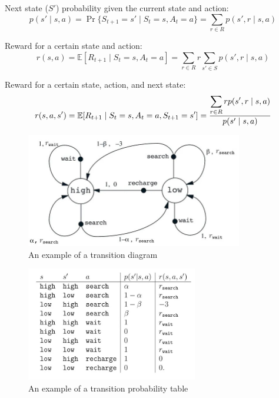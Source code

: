 Next state ($S'$) probability given the current state and action:
\[
    p(s' \mid s, a) = \Pr\{S_{t+1} = s' \mid S_t = s, A_t = a\} = \sum_{r \in {R}} p(s', r \mid s, a)
\]

Reward for a certain state and action:
\[
    r(s, a) = \mathbb{E}[R_{t+1} \mid S_t = s, A_t = a] = \sum_{r \in {R}} r \sum_{s' \in {S}} p(s', r \mid s, a)
\]

Reward for a certain state, action, and next state:
\[
    r(s, a, s') = \mathbb{E}[R_{t+1} \mid S_t = s, A_t = a, S_{t+1} = s'] = \dfrac{\displaystyle\sum_{r \in {R}} r p(s', r \mid s, a)}{p(s' \mid s, a)}
\]

\begin{table}[H]
    \centering
    \begin{minipage}{0.35\linewidth}
        \begin{figure}[H]
            \includegraphics[height=5cm]{Pictures/deep-reinforcement-learning/eg1_mdp_fig.jpg}
            \caption{An example of a transition diagram}
        \end{figure}
    \end{minipage}
    \hfill
    \begin{minipage}{0.35\linewidth}
        \begin{figure}[H]
            \includegraphics[height=5cm]{Pictures/deep-reinforcement-learning/eg1_mdp_table.jpg}
            \caption{An example of a transition probability table}
        \end{figure}
    \end{minipage}
\end{table}

